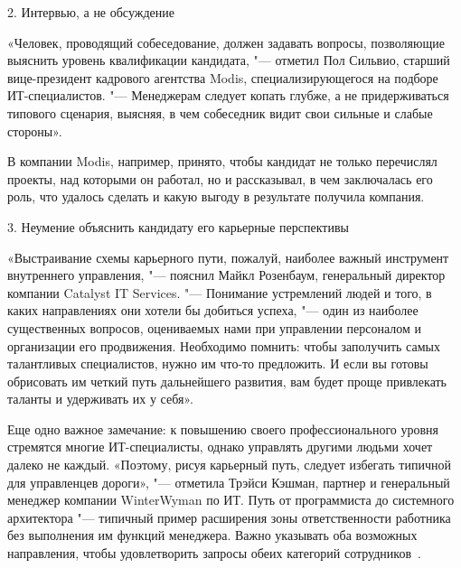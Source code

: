 \documentclass{../industrial-development}
\begin{document}
2. \alert{Интервью, а не обсуждение}

«Человек, проводящий собеседование, должен задавать вопросы, позволяющие выяснить уровень квалификации кандидата, "--- отметил Пол Сильвио, старший вице-президент кадрового агентства Modis, специализирующегося на подборе ИТ-специалистов. "--- Менеджерам следует копать глубже, а не придерживаться типового сценария, выясняя, в чем собеседник видит свои сильные и слабые стороны».

В компании Modis, например, принято, чтобы кандидат не только перечислял проекты, над которыми он работал, но и рассказывал, в чем заключалась его роль, что удалось сделать и какую выгоду в результате получила компания.

3. \alert{Неумение объяснить кандидату его карьерные перспективы}

«Выстраивание схемы карьерного пути, пожалуй, наиболее важный инструмент внутреннего управления, "--- пояснил Майкл Розенбаум, генеральный директор компании Catalyst IT Services. "--- Понимание устремлений людей и того, в каких направлениях они хотели бы добиться успеха, "--- один из наиболее существенных вопросов, оцениваемых нами при управлении персоналом и организации его продвижения. Необходимо помнить: чтобы заполучить самых талантливых специалистов, нужно им что-то предложить. И если вы готовы обрисовать им четкий путь дальнейшего развития, вам будет проще привлекать таланты и удерживать их у себя».

Еще одно важное замечание: к повышению своего профессионального уровня стремятся многие ИТ-специалисты, однако управлять другими людьми хочет далеко не каждый. «Поэтому, рисуя карьерный путь, следует избегать типичной для управленцев дороги», "--- отметила Трэйси Кэшман, партнер и генеральный менеджер компании WinterWyman по ИТ. Путь от программиста до системного архитектора "--- типичный пример расширения зоны ответственности работника без выполнения им функций менеджера. Важно указывать оба возможных направления, чтобы удовлетворить запросы обеих категорий сотрудников~\cite{RichHein}.


\end{document}
